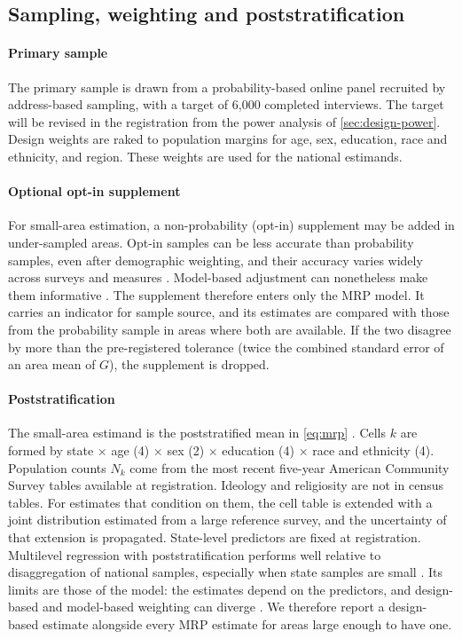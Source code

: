 \subsection{Sampling, weighting and poststratification}\label{sec:design-sampling}

\paragraph{Primary sample}
The primary sample is drawn from a probability-based online panel recruited by address-based sampling, with a target of 6,000 completed interviews. The target will be revised in the registration from the power analysis of \cref{sec:design-power}. Design weights are raked to population margins for age, sex, education, race and ethnicity, and region. These weights are used for the national estimands.

\paragraph{Optional opt-in supplement}
For small-area estimation, a non-probability (opt-in) supplement may be added in under-sampled areas. Opt-in samples can be less accurate than probability samples, even after demographic weighting, and their accuracy varies widely across surveys and measures \citep{yeager2011,baker2013}. Model-based adjustment can nonetheless make them informative \citep{wang2015}. The supplement therefore enters only the MRP model. It carries an indicator for sample source, and its estimates are compared with those from the probability sample in areas where both are available. If the two disagree by more than the pre-registered tolerance (twice the combined standard error of an area mean of $G$), the supplement is dropped.

\paragraph{Poststratification}
The small-area estimand is the poststratified mean in \cref{eq:mrp} \citep{gelman1997,park2004}. Cells $k$ are formed by state $\times$ age (4) $\times$ sex (2) $\times$ education (4) $\times$ race and ethnicity (4). Population counts $N_k$ come from the most recent five-year American Community Survey tables available at registration. Ideology and religiosity are not in census tables. For estimates that condition on them, the cell table is extended with a joint distribution estimated from a large reference survey, and the uncertainty of that extension is propagated. State-level predictors are fixed at registration. Multilevel regression with poststratification performs well relative to disaggregation of national samples, especially when state samples are small \citep{lax2009}. Its limits are those of the model: the estimates depend on the predictors, and design-based and model-based weighting can diverge \citep{gelman2007}. We therefore report a design-based estimate alongside every MRP estimate for areas large enough to have one.

